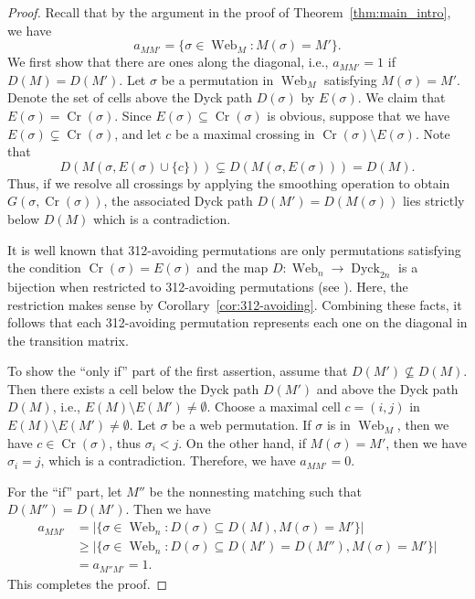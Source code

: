 \documentclass[reqno,12pt]{amsart}
\theoremstyle{definition}
\theoremstyle{remark}
\newcommand\Dyck{\operatorname{Dyck}}
\newcommand\Cr{\operatorname{Cr}}
\newcommand\Web{\operatorname{Web}}
\begin{document}
\begin{proof}
  Recall that by the argument in the proof of Theorem~\ref{thm:main_intro}, we have
  \[
      a_{MM'}=\{\sigma\in\Web_M:M(\sigma)=M'\}.
  \]
  We first show that there are ones along the diagonal, i.e.,
  \( a_{MM'}=1 \) if \( D(M)=D(M') \).
  Let $\sigma$ be a permutation in $\Web_M$ satisfying $M(\sigma)=M'$.
  Denote the set of cells above the Dyck path $D(\sigma)$ by $E(\sigma)$.
  We claim that $E(\sigma)=\Cr(\sigma)$.
  Since \(E(\sigma)\subseteq \Cr(\sigma)\) is obvious, suppose that we have $E(\sigma)\subsetneq\Cr(\sigma)$, and let $c$ be a maximal crossing in \( \Cr(\sigma)\setminus E(\sigma) \).
  Note that \[D(M(\sigma,E(\sigma)\cup \{c\}))\subsetneq D(M(\sigma,E(\sigma)))=D(M).\]
  Thus, if we resolve all crossings by applying the smoothing operation to obtain $G(\sigma,\Cr(\sigma))$, 
  the associated Dyck path $D(M')=D(M(\sigma))$ lies strictly below $D(M)$ 
  which is a contradiction.

  It is well known that 312-avoiding permutations are only permutations satisfying
  the condition \( \Cr(\sigma)=E(\sigma) \) and the map $D:\Web_n\rightarrow \Dyck_{2n}$ is a bijection
  when restricted to 312-avoiding permutations (see \cite[§1.2]{Sta12}).
  Here, the restriction makes sense by Corollary~\ref{cor:312-avoiding}.
  Combining these facts, it follows that each 312-avoiding permutation represents 
  each one on the diagonal in the transition matrix.

  To show the ``only if'' part of the first assertion, assume that $D(M') \nsubseteq D(M)$.
  Then there exists a cell below the Dyck path $D(M')$ and above the Dyck path
  $D(M)$, i.e., \( E(M)\setminus E(M')\neq\emptyset. \)
  Choose a maximal cell $c=(i,j)$ in \( E(M)\setminus E(M')\neq\emptyset. \)
  Let $\sigma$ be a web permutation. 
  If $\sigma$ is in $\Web_M$, then we have $c\in\Cr(\sigma)$, thus $\sigma_i<j$. 
  On the other hand, if $M(\sigma)=M'$, then we have $\sigma_i=j$, which is a contradiction. 
  Therefore, we have \( a_{MM'}=0 \).

  For the ``if'' part, let $M''$ be the nonnesting matching such that $D(M'')=D(M')$. Then we have
  \begin{align*}
    a_{MM'} 
    &= |\{\sigma \in \Web_n: D(\sigma)\subseteq D(M), M(\sigma)=M'\}| \\
    &\ge |\{\sigma \in \Web_n: D(\sigma)\subseteq D(M')=D(M''), M(\sigma)=M'\}| \\
    &= a_{M''M'}=1.
  \end{align*}
  This completes the proof.
\end{proof}
\end{document}
